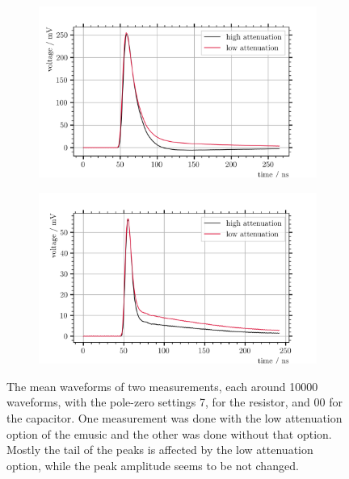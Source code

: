 \begin{figure}
	\centering
	\begin{subfigure}[b]{1.\textwidth}
		\centering
		\includegraphics[width=1.\textwidth]{pictures/att_pz331}
		\caption[]{}
		\label{fig:pz331_att}
	\end{subfigure}
	\begin{subfigure}[b]{1.\textwidth}
		\centering
		\includegraphics[width=1.\textwidth]{pictures/att_pz700}
		\caption[]{}
		\label{fig:pz700_att}
	\end{subfigure}
	\caption[todo]{The mean waveforms of two measurements, each around \num{10000} waveforms, with the pole-zero settings 7, for the resistor, and 00 for the capacitor. One measurement was done with the low attenuation option of the \ac{emusic} and the other was done without that option. Mostly the tail of the peaks is affected by the low attenuation option, while the peak amplitude seems to be not changed.}
	\label{fig:pz_att}
\end{figure}

